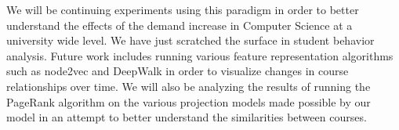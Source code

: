 \documentclass{sigchi}
\begin{document}
We will be continuing experiments using this paradigm in order to better understand the effects of the demand increase in Computer Science at a university wide level. We have just scratched the surface in student behavior analysis. Future work includes running various feature representation algorithms such as node2vec and DeepWalk in order to visualize changes in course relationships over time. We will also be analyzing the results of running the PageRank algorithm on the various projection models made possible by our model in an attempt to better understand the similarities between courses.

\balance{}



\end{document}
